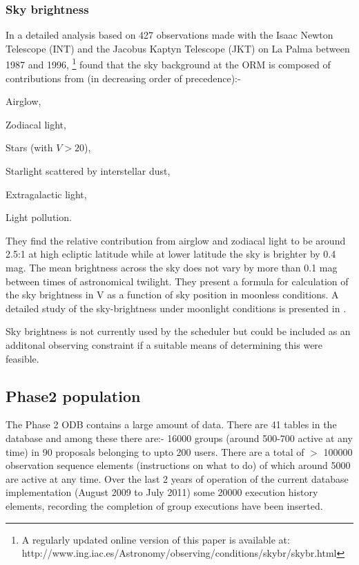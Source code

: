 {{\subsubsection{Sky brightness}
In a detailed analysis based on 427 observations made with the Isaac Newton Telescope (INT) and the Jacobus Kaptyn Telescope (JKT) on La Palma between 1987 and 1996, \citet{lapalma115} \footnote{A regularly updated online version of this paper is available at: http://www.ing.iac.es/Astronomy/observing/conditions/skybr/skybr.html} found that the sky background at the ORM is composed of contributions from (in decreasing order of precedence):-
\begin{inparaenum} \item Airglow, \item Zodiacal light, \item Stars (with $V > 20$), \item Starlight scattered by interstellar dust, \item Extragalactic light, \item Light pollution.
\end{inparaenum}

 They find the relative contribution from airglow and zodiacal light to be around 2.5:1 at high ecliptic latitude while at lower latitude the sky is brighter by 0.4 mag. The mean brightness across the sky does not vary by more than 0.1 mag between times of astronomical twilight. They present a formula for calculation of the sky brightness in V as a function of sky position in moonless conditions. A detailed study of the sky-brightness under moonlight conditions is presented in \citet{krisciunas91brightness}.

Sky brightness is not currently used by the scheduler but could be included as an additonal observing constraint if a suitable means of determining this were feasible.

\subsection{Phase2 population}

The Phase 2 ODB contains a large amount of data. There are 41 tables in the database and among these there are:- 16000 groups (around 500-700 active at any time) in 90 proposals belonging to upto 200 users. There are a total of $>$ 100000 observation sequence elements (instructions on what to do) of which around 5000 are active at any time.  Over the last 2 years of operation  of the current database implementation (August 2009 to July 2011) some 20000 execution history elements, recording the completion of group executions have been inserted. 

}}
